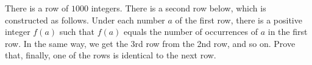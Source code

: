 There is a row of $1000$ integers. There is a second row below, which is constructed as follows. Under each number $a$ of the first row, there is a positive integer $f(a)$ such that $f(a)$ equals the number of occurrences of $a$ in the first row. In the same way, we get the 3rd row from the 2nd row, and so on. Prove that, finally, one of the rows is identical to the next row.
